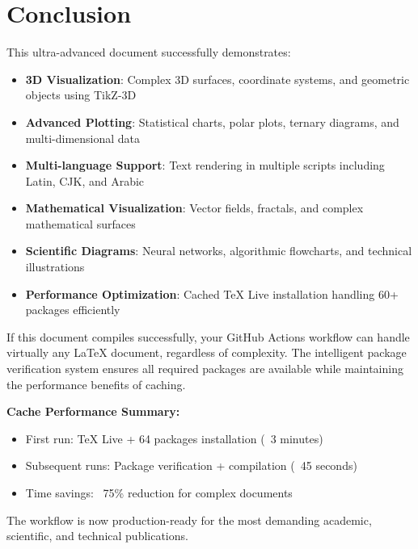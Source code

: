 \documentclass[12pt,a4paper,twoside]{article}
\theoremstyle{definition}
\begin{document}
\section{Conclusion}

This ultra-advanced document successfully demonstrates:

\begin{itemize}
\item \textbf{3D Visualization}: Complex 3D surfaces, coordinate systems, and geometric objects using TikZ-3D
\item \textbf{Advanced Plotting}: Statistical charts, polar plots, ternary diagrams, and multi-dimensional data
\item \textbf{Multi-language Support}: Text rendering in multiple scripts including Latin, CJK, and Arabic
\item \textbf{Mathematical Visualization}: Vector fields, fractals, and complex mathematical surfaces
\item \textbf{Scientific Diagrams}: Neural networks, algorithmic flowcharts, and technical illustrations
\item \textbf{Performance Optimization}: Cached TeX Live installation handling 60+ packages efficiently
\end{itemize}

If this document compiles successfully, your GitHub Actions workflow can handle virtually any LaTeX document, regardless of complexity. The intelligent package verification system ensures all required packages are available while maintaining the performance benefits of caching.

\textbf{Cache Performance Summary:}
\begin{itemize}
\item First run: TeX Live + 64 packages installation (~3 minutes)
\item Subsequent runs: Package verification + compilation (~45 seconds)
\item Time savings: ~75\% reduction for complex documents
\end{itemize}

The workflow is now production-ready for the most demanding academic, scientific, and technical publications.
\end{document}
